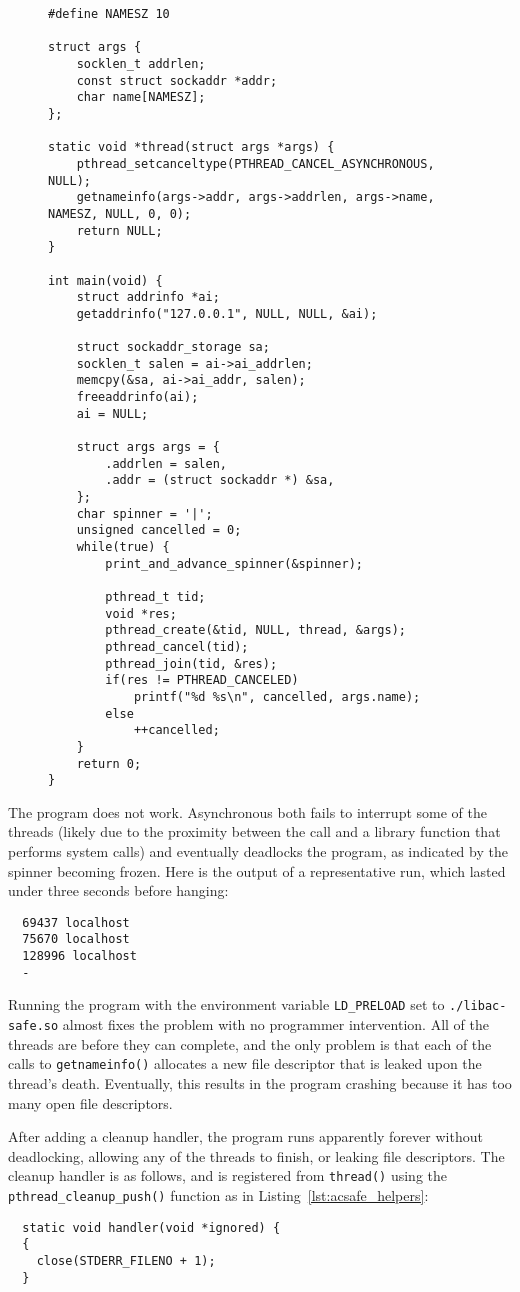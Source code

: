 \begin{figure}
\begin{lstlisting}[label=lst:acsafe_example,caption=Example program using asynchronous thread cancellation]
#define NAMESZ 10

struct args {
	socklen_t addrlen;
	const struct sockaddr *addr;
	char name[NAMESZ];
};

static void *thread(struct args *args) {
	pthread_setcanceltype(PTHREAD_CANCEL_ASYNCHRONOUS, NULL);
	getnameinfo(args->addr, args->addrlen, args->name, NAMESZ, NULL, 0, 0);
	return NULL;
}

int main(void) {
	struct addrinfo *ai;
	getaddrinfo("127.0.0.1", NULL, NULL, &ai);

	struct sockaddr_storage sa;
	socklen_t salen = ai->ai_addrlen;
	memcpy(&sa, ai->ai_addr, salen);
	freeaddrinfo(ai);
	ai = NULL;

	struct args args = {
		.addrlen = salen,
		.addr = (struct sockaddr *) &sa,
	};
	char spinner = '|';
	unsigned cancelled = 0;
	while(true) {
		print_and_advance_spinner(&spinner);

		pthread_t tid;
		void *res;
		pthread_create(&tid, NULL, thread, &args);
		pthread_cancel(tid);
		pthread_join(tid, &res);
		if(res != PTHREAD_CANCELED)
			printf("%d %s\n", cancelled, args.name);
		else
			++cancelled;
	}
	return 0;
}
\end{lstlisting}
\end{figure}

The program does not work.  Asynchronous  both fails to interrupt some
of the threads (likely due to the proximity between the call and a library
function that performs system calls) and eventually deadlocks the program, as
indicated by the spinner becoming frozen.  Here is the output of a representative
run, which lasted under three seconds before hanging:
\begin{lstlisting}
  69437 localhost
  75670 localhost
  128996 localhost
  -
\end{lstlisting}

Running the program with the environment variable \texttt{LD\_PRELOAD} set to
\texttt{./libac-safe.so} almost fixes the problem with no programmer intervention.
All of the threads are  before they can complete, and the only problem is
that each of the calls to \texttt{getnameinfo()} allocates a new file descriptor that
is leaked upon the thread's death.  Eventually, this results in the program crashing
because it has too many open file descriptors.

After adding a cleanup handler, the program runs apparently forever without
deadlocking, allowing any of the threads to finish, or leaking file descriptors.  The
cleanup handler is as follows, and is registered from \texttt{thread()} using the
\texttt{pthread\_cleanup\_push()} function as in Listing~\ref{lst:acsafe_helpers}:
\begin{lstlisting}
  static void handler(void *ignored) {
  {
  	close(STDERR_FILENO + 1);
  }
\end{lstlisting}
